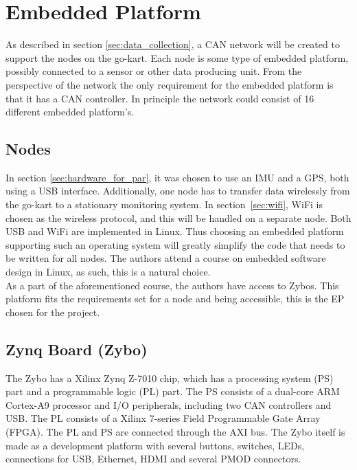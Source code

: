 
\section{Embedded Platform}\label{sec:EP}
As described in section \ref{sec:data_collection}, a CAN network will be created to support the nodes on the go-kart.
Each node is some type of embedded platform, possibly connected to a sensor or other data producing unit.
From the perspective of the network the only requirement for the embedded platform is that it has a CAN controller.
In principle the network could consist of 16 different embedded platform's.
\subsection{Nodes}
In section \ref{sec:hardware_for_par}, it was chosen to use an IMU and a GPS, both using a USB interface.
Additionally, one node has to transfer data wirelessly from the go-kart to a stationary monitoring system.
In section~\ref{sec:wifi}, WiFi is chosen as the wireless protocol, and this will be handled on a separate node.
Both USB and WiFi are implemented in Linux.
Thus choosing an embedded platform supporting such an operating system will greatly simplify the code that needs to be written for all nodes.
The authors attend a course on embedded software design in Linux, as such, this is a natural choice.\\

As a part of the aforementioned course, the authors have access to Zybos.
This platform fits the requirements set for a node and being accessible, this is the EP chosen for the project.

\subsection{Zynq Board (Zybo)}
The Zybo has a Xilinx Zynq Z-7010 chip, which has a processing system (PS) part and a programmable logic (PL) part.
The PS consists of a dual-core ARM Cortex-A9 processor and I/O peripherals, including two CAN controllers and USB.
The PL consists of a Xilinx 7-series Field Programmable Gate Array (FPGA). 
The PL and PS are connected through the AXI bus.
The Zybo itself is made as a development platform with several buttons, switches, LEDs, connections for USB, Ethernet, HDMI and several PMOD connectors.

